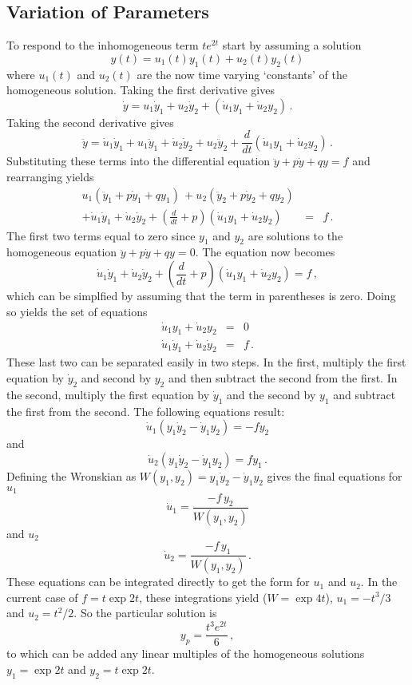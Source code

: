 \documentclass[10pt]{article}
\begin{document}
\subsection{Variation of Parameters}
To respond to the inhomogeneous term $t e^{2t}$ start by assuming a solution
\[
  y(t) = u_1(t) y_1(t) + u_2(t) y_2(t)
\]
where $u_1(t)$ and $u_2(t)$ are the now time varying `constants' of the 
homogeneous solution.  Taking the first derivative gives
\[
{\dot y} = u_1 {\dot y}_1 + u_2 {\dot y}_2 + \left( {\dot u}_1 y_1 + {\dot u}_2 y_2 \right) \, .
\]
Taking the second derivative gives 
\[
  {\ddot y} =   {\dot u_1} {\dot y}_1 + u_1 {\ddot y_1}
              + {\dot u_2} {\dot y}_2 + u_2 {\ddot y_2}
              + \frac{d}{dt} \left( {\dot u}_1 y_1 + {\dot u}_2 y_2 \right)\, .
\]
Substituting these terms into the differential equation ${\ddot y} + p {\dot y} + q y = f$ and rearranging yields
\begin{eqnarray}
      u_1 \left( {\ddot y_1} + p {\dot y_1} + q y_1 \right) \,
   +  u_2 \left( {\ddot y_2} + p {\dot y_2} + q y_2 \right) \, & & \\
   +  {\dot u}_1 {\dot y}_1 + {\dot u}_2 {\dot y}_2                        
   +  \left( \frac{d}{dt} + p \right) \left( {\dot u}_1 y_1 
   + {\dot u}_2 y_2 \right) & = &  f \, .
\end{eqnarray}
The first two terms equal to zero since $y_1$ and $y_2$ are solutions to the homogeneous 
equation ${\ddot y} + p {\dot y} + q y = 0$. 
The equation now becomes
\[
  {\dot u}_1 {\dot y}_1 + {\dot u}_2 {\dot y}_2 
+ \left( \frac{d}{dt} + p \right) 
  \left( {\dot u}_1 y_1  + {\dot u}_2 y_2 \right) = f \, ,
\]
which can be simplfied by assuming that the term in parentheses is zero.  
Doing so yields the set of equations
\begin{eqnarray}
  {\dot u}_1 y_1        + {\dot u}_2 y_2        & = & 0 \\
  {\dot u}_1 {\dot y}_1 + {\dot u}_2 {\dot y}_2 & = & f \, .
\end{eqnarray}
These last two can be separated easily in two steps.  In the first, multiply 
the first equation by ${\dot y}_2$ and second by $y_2$ and then
subtract the second from the first.  In the second, multiply the first equation
by ${\dot y}_1$ and the second by $y_1$ and subtract the first from the second.
The following equations result:
\[
  {\dot u}_1 \left( y_1 {\dot y}_2 - {\dot y}_1 y_2 \right) = - f y_2
\]
and
\[
  {\dot u}_2 \left( y_1 {\dot y}_2 - {\dot y}_1 y_2 \right) =   f y_1 \, .
\]
Defining the Wronskian as $W(y_1,y_2) = y_1 {\dot y}_2 - {\dot y}_1 y_2$ gives
the final equations for $u_1$ 
\[
  {\dot u}_1 = \frac{-f \, y_2}{W(y_1,y_2)}
\]
and $u_2$
\[
  {\dot u}_2 = \frac{-f \, y_1}{W(y_1,y_2)} \, .
\]
These equations can be integrated directly to get the form for 
$u_1$ and $u_2$.  In the current case of $f = t \exp{2 t}$, these 
integrations yield ($W = \exp{4 t}$), $u_1 = -t^3/3$ and $u_2 = t^2/2$.
So the particular solution is
\[
  y_p = \frac{t^3 e^{2t}}{6} \, ,
\]
to which can be added any linear multiples of the homogeneous solutions
$y_1 = \exp{2 t}$ and $y_2 = t \exp{2 t}$.
\end{document}
